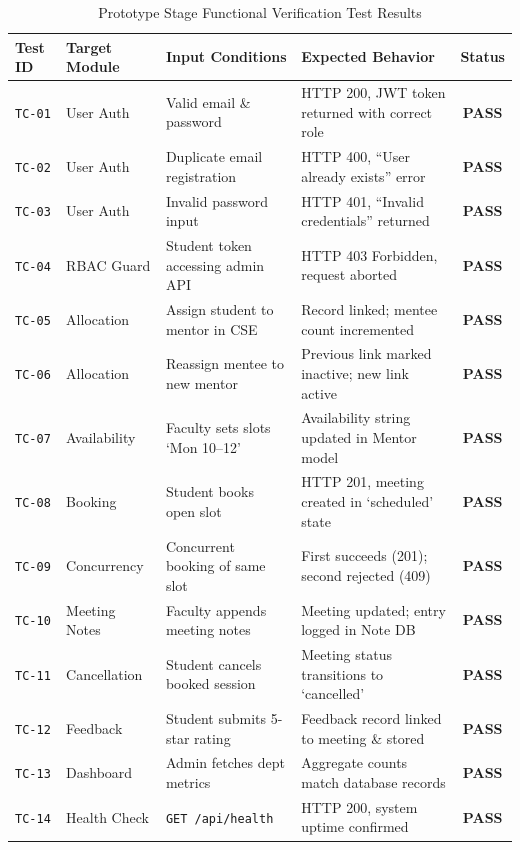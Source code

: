 \documentclass[11pt,a4paper]{article}
\begin{document}
\begin{table}[H]
\centering
\scriptsize
\begin{tabularx}{\textwidth}{@{}llp{3.5cm}Xc@{}}
\toprule
\textbf{Test ID} & \textbf{Target Module} & \textbf{Input Conditions} & \textbf{Expected Behavior} & \textbf{Status} \\
\midrule
\texttt{TC-01} & User Auth & Valid email \& password & HTTP 200, JWT token returned with correct role & \textbf{\color{successgreen}PASS} \\
\texttt{TC-02} & User Auth & Duplicate email registration & HTTP 400, ``User already exists'' error & \textbf{\color{successgreen}PASS} \\
\texttt{TC-03} & User Auth & Invalid password input & HTTP 401, ``Invalid credentials'' returned & \textbf{\color{successgreen}PASS} \\
\texttt{TC-04} & RBAC Guard & Student token accessing admin API & HTTP 403 Forbidden, request aborted & \textbf{\color{successgreen}PASS} \\
\texttt{TC-05} & Allocation & Assign student to mentor in CSE & Record linked; mentee count incremented & \textbf{\color{successgreen}PASS} \\
\texttt{TC-06} & Allocation & Reassign mentee to new mentor & Previous link marked inactive; new link active & \textbf{\color{successgreen}PASS} \\
\texttt{TC-07} & Availability & Faculty sets slots `Mon 10--12' & Availability string updated in Mentor model & \textbf{\color{successgreen}PASS} \\
\texttt{TC-08} & Booking & Student books open slot & HTTP 201, meeting created in `scheduled' state & \textbf{\color{successgreen}PASS} \\
\texttt{TC-09} & Concurrency & Concurrent booking of same slot & First succeeds (201); second rejected (409) & \textbf{\color{successgreen}PASS} \\
\texttt{TC-10} & Meeting Notes & Faculty appends meeting notes & Meeting updated; entry logged in Note DB & \textbf{\color{successgreen}PASS} \\
\texttt{TC-11} & Cancellation & Student cancels booked session & Meeting status transitions to `cancelled' & \textbf{\color{successgreen}PASS} \\
\texttt{TC-12} & Feedback & Student submits 5-star rating & Feedback record linked to meeting \& stored & \textbf{\color{successgreen}PASS} \\
\texttt{TC-13} & Dashboard & Admin fetches dept metrics & Aggregate counts match database records & \textbf{\color{successgreen}PASS} \\
\texttt{TC-14} & Health Check & \texttt{GET /api/health} & HTTP 200, system uptime confirmed & \textbf{\color{successgreen}PASS} \\
\bottomrule
\end{tabularx}
\caption{Prototype Stage Functional Verification Test Results}
\label{tab:tests}
\end{table}
\end{document}
